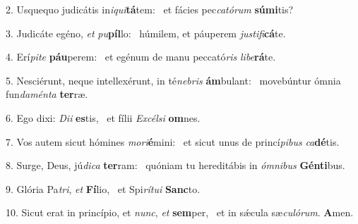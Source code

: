 2. Usquequo judicátis in\textit{i}\textit{qui}\textbf{tá}tem: \ast\  et fácies pec\textit{ca}\textit{tó}\textit{rum} \textbf{sú}\textbf{mi}tis?\

3. Judicáte egéno, \textit{et} \textit{pu}\textbf{píl}lo: \ast\  húmilem, et páuperem \textit{jus}\textit{ti}\textit{fi}\textbf{cá}te.\

4. Erí\textit{pi}\textit{te} \textbf{páu}perem: \ast\  et egénum de manu peccató\textit{ris} \textit{li}\textit{be}\textbf{rá}te.\

5. Nesciérunt, neque intellexérunt, in té\textit{ne}\textit{bris} \textbf{ám}bulant: \ast\  movebúntur ómnia fun\textit{da}\textit{mén}\textit{ta} \textbf{ter}ræ.\

6. Ego dixi: \textit{Di}\textit{i} \textbf{es}tis, \ast\  et fílii \textit{Ex}\textit{cél}\textit{si} \textbf{om}nes.\

7. Vos autem sicut hómines \textit{mo}\textit{ri}\textbf{é}mini: \ast\  et sicut unus de princí\textit{pi}\textit{bus} \textit{ca}\textbf{dé}tis.\

8. Surge, Deus, jú\textit{di}\textit{ca} \textbf{ter}ram: \ast\  quóniam tu hereditábis in \textit{óm}\textit{ni}\textit{bus} \textbf{Gén}\textbf{ti}bus.\

9. Glória Pa\textit{tri}, \textit{et} \textbf{Fí}lio, \ast\  et Spi\textit{rí}\textit{tu}\textit{i} \textbf{Sanc}to.\

10. Sicut erat in princípio, et \textit{nunc}, \textit{et} \textbf{sem}per, \ast\  et in sǽcula sæ\textit{cu}\textit{ló}\textit{rum}. \textbf{A}men.\

